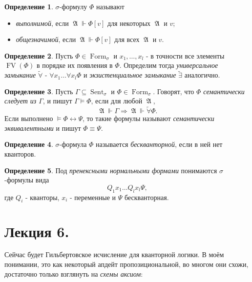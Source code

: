 \documentclass[a4paper,100pt]{article}
\theoremstyle{indented}
\theoremstyle{definition}
\newtheorem{defn}{Определение}
\theoremstyle{remark}
\DeclareMathOperator{\form}{Form}
\DeclareMathOperator{\FV}{FV}
\DeclareMathOperator{\Sent}{Sent}
\DeclareMathOperator{\GA}{\mathfrak{A}}
\begin{document}
\begin{defn}
  $\sigma$-формулу $\Phi$ называют 

  \begin{itemize}
    \item \textit{выполнимой}, если $\GA \Vdash \Phi[v]$ для некоторых $\GA$ и $v$; 
    \item \textit{общезначимой}, если $\GA\Vdash \Phi[v]$ для всех $\GA$ и $v$. 
  \end{itemize}
\end{defn}

\begin{defn}
  Пусть $\Phi \in \form_\sigma$ и $x_1, \ldots, x_l$ - в точности все элементы $\FV(\Phi)$ в порядке их появления в $\Phi$. Определим тогда \textit{универсальное замыкание} $\tilde{\forall}$ - $\forall x_1 \ldots \forall x_l \Phi$ и \textit{экзистенциальное замыкание} $\tilde{\exists}$ аналогично.
\end{defn}

\begin{defn}
  Пусть $\Gamma \subseteq \Sent_\sigma$ и $\Phi \in \form_\sigma$. Говорят, что \textit{$\Phi$ семантически следует из $\Gamma$}, и пишут $\Gamma \vDash \Phi$, если для любой $\GA$, 
  \[
    \GA \Vdash \Gamma \Longrightarrow \GA \Vdash \tilde{\forall}\Phi. 
  \]
  Если выполнено $\vDash \Phi \leftrightarrow \Psi$, то такие формулы называют \textit{семантически эквивалентными} и пишут $\Phi \equiv \Psi$. 
\end{defn}

\begin{defn}
  $\sigma$-формула $\Phi$ называется \textit{бескванторной}, если в ней нет кванторов.
\end{defn}

\begin{defn}
  Под \textit{пренексными нормальными формами} понимаются $\sigma$-формулы вида 
  \[
    Q_1 x_1 \ldots Q_l x_l \Psi,
  \]
  где $Q_i$ - кванторы, $x_i$ - переменные и $\Psi$ бескванторная.
\end{defn}

\section{Лекция 6.}

Сейчас будет Гильбертовское исчисление для кванторной логики. В моём понимании, это как некоторый апдейт пропозициональной, во многом они схожи, достаточно только взглянуть на \textit{схемы аксиом}:
\end{document}
